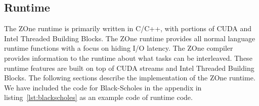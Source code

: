
\subsection{Runtime}
The ZOne runtime is primarily written in C/C++, with portions of CUDA and
Intel Threaded Building Blocks.
 The ZOne runtime provides all
normal language runtime functions with a focus on hiding I/O latency. The ZOne
compiler provides information to the runtime about what tasks can be
interleaved. These runtime features are built on top of CUDA streams and 
Intel Threaded Building Blocks. The following sections describe the
implementation of the ZOne runtime.
We have included the code for Black-Scholes in the appendix in 
listing~\ref{lst:blackscholes} as an example code of runtime code.





